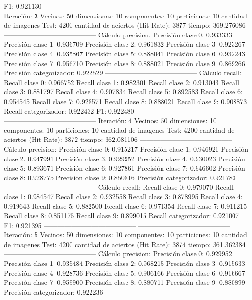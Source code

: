 F1: 0.921130
-----------------------------------------
-----------------------------------------
Iteración: 3
Vecinos: 50
dimensiones: 10
componentes: 10
particiones: 10
cantidad de imagenes Test: 4200
cantidad de aciertos (Hit Rate): 3877
tiempo: 369.276086
-----------------------------------------
Cálculo precision: 
Precisión clase 0: 0.933333
Precisión clase 1: 0.936709
Precisión clase 2: 0.961832
Precisión clase 3: 0.923267
Precisión clase 4: 0.935867
Precisión clase 5: 0.888041
Precisión clase 6: 0.932243
Precisión clase 7: 0.956710
Precisión clase 8: 0.888021
Precisión clase 9: 0.869266
Precisión categorizador: 0.922529
-----------------------------------------
Cálculo recall: 
Recall clase 0: 0.966752
Recall clase 1: 0.982301
Recall clase 2: 0.913043
Recall clase 3: 0.881797
Recall clase 4: 0.907834
Recall clase 5: 0.892583
Recall clase 6: 0.954545
Recall clase 7: 0.928571
Recall clase 8: 0.888021
Recall clase 9: 0.908873
Recall categorizador: 0.922432
F1: 0.922480
-----------------------------------------
-----------------------------------------
Iteración: 4
Vecinos: 50
dimensiones: 10
componentes: 10
particiones: 10
cantidad de imagenes Test: 4200
cantidad de aciertos (Hit Rate): 3872
tiempo: 362.081106
-----------------------------------------
Cálculo precision: 
Precisión clase 0: 0.915217
Precisión clase 1: 0.946921
Precisión clase 2: 0.947991
Precisión clase 3: 0.929952
Precisión clase 4: 0.930023
Precisión clase 5: 0.893671
Precisión clase 6: 0.927861
Precisión clase 7: 0.946602
Precisión clase 8: 0.928775
Precisión clase 9: 0.850816
Precisión categorizador: 0.921783
-----------------------------------------
Cálculo recall: 
Recall clase 0: 0.979070
Recall clase 1: 0.984547
Recall clase 2: 0.932558
Recall clase 3: 0.878995
Recall clase 4: 0.919643
Recall clase 5: 0.882500
Recall clase 6: 0.971354
Recall clase 7: 0.911215
Recall clase 8: 0.851175
Recall clase 9: 0.899015
Recall categorizador: 0.921007
F1: 0.921395
-----------------------------------------
-----------------------------------------
Iteración: 5
Vecinos: 50
dimensiones: 10
componentes: 10
particiones: 10
cantidad de imagenes Test: 4200
cantidad de aciertos (Hit Rate): 3874
tiempo: 361.362384
-----------------------------------------
Cálculo precision: 
Precisión clase 0: 0.929952
Precisión clase 1: 0.935484
Precisión clase 2: 0.968215
Precisión clase 3: 0.915633
Precisión clase 4: 0.928736
Precisión clase 5: 0.906166
Precisión clase 6: 0.916667
Precisión clase 7: 0.959900
Precisión clase 8: 0.880711
Precisión clase 9: 0.880899
Precisión categorizador: 0.922236
-----------------------------------------
